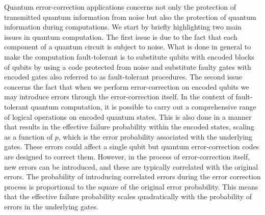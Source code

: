 \documentclass{Configuration_Files/PoliMi3i_thesis}
\begin{document}
Quantum error-correction applications concerns not only the protection of transmitted quantum information from noise but also the protection of quantum information during computations. 
We start by briefly highlighting two main issues in quantum computation. The first issue is due to the fact that each component of a quantum circuit is subject to noise. 
What is done in general to make the computation fault-tolerant is to substitute qubits with encoded blocks of qubits by using a code protected from noise and substitute faulty gates with encoded gates also referred to as fault-tolerant procedures. 
The second issue concerns the fact that when we perform error-correction on encoded qubits we may introduce errors through the error-correction itself. \newline
In the context of fault-tolerant quantum computation, it is possible to carry out a comprehensive range of logical operations on encoded quantum states. This is also done in a manner that results in the effective failure probability within the encoded states, scaling as a function of $p$, which is the error probability associated with the underlying gates. These errors could affect a single qubit but quantum error-correction codes are designed to correct them. However, in the process of error-correction itself, new errors can be introduced, and these are typically correlated with the original errors. The probability of introducing correlated errors during the error correction process is proportional to the square of the original error probability. This means that the effective failure probability scales quadratically with the probability of errors in the underlying gates. \newline
\end{document}
